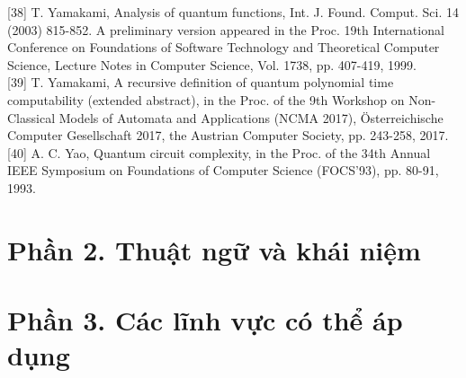 \documentclass[10pt]{article}
\begin{document}
[38] T. Yamakami, Analysis of quantum functions, Int. J. Found. Comput. Sci. 14 (2003) 815-852. A preliminary version appeared in the Proc. 19th International Conference on Foundations of Software Technology and Theoretical Computer Science, Lecture Notes in Computer Science, Vol. 1738, pp. 407-419, 1999.\\[0pt]
[39] T. Yamakami, A recursive definition of quantum polynomial time computability (extended abstract), in the Proc. of the 9th Workshop on Non-Classical Models of Automata and Applications (NCMA 2017), Österreichische Computer Gesellschaft 2017, the Austrian Computer Society, pp. 243-258, 2017.\\[0pt]
[40] A. C. Yao, Quantum circuit complexity, in the Proc. of the 34th Annual IEEE Symposium on Foundations of Computer Science (FOCS'93), pp. 80-91, 1993.

\clearpage
\section*{Phần 2. Thuật ngữ và khái niệm}
{\begingroup
\fontsize{12pt}{18pt}\selectfont
\let\maketitle\relax
\par\endgroup}

\clearpage
\section*{Phần 3. Các lĩnh vực có thể áp dụng}
{\begingroup
\fontsize{12pt}{18pt}\selectfont
\let\maketitle\relax
\par\endgroup}
\end{document}

